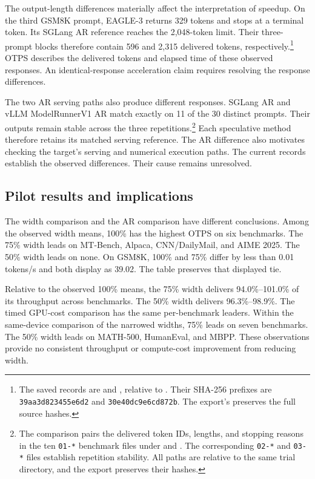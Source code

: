\documentclass[conference,onecolumn]{IEEEtran}
\begin{document}
The output-length differences materially affect the interpretation of speedup. On the third GSM8K prompt, EAGLE-3 returns 329 tokens and stops at a terminal token. Its SGLang AR reference reaches the 2,048-token limit. Their three-prompt blocks therefore contain 596 and 2,315 delivered tokens, respectively.\footnote{The saved records are  and , relative to . Their SHA-256 prefixes are \texttt{39aa3d823455e6d2} and \texttt{30e40dc9e6cd872b}. The export's  preserves the full source hashes.} OTPS describes the delivered tokens and elapsed time of these observed responses. An identical-response acceleration claim requires resolving the response differences.

The two AR serving paths also produce different responses. SGLang AR and vLLM ModelRunnerV1 AR match exactly on 11 of the 30 distinct prompts. Their outputs remain stable across the three repetitions.\footnote{The comparison pairs the delivered token IDs, lengths, and stopping reasons in the ten \texttt{01-*} benchmark files under  and . The corresponding \texttt{02-*} and \texttt{03-*} files establish repetition stability. All paths are relative to the same trial directory, and the export preserves their hashes.} Each speculative method therefore retains its matched serving reference. The AR difference also motivates checking the target's serving and numerical execution paths. The current records establish the observed differences. Their cause remains unresolved.

\subsection{Pilot results and implications}
The width comparison and the AR comparison have different conclusions. Among the observed width means, 100\% has the highest OTPS on six benchmarks. The 75\% width leads on MT-Bench, Alpaca, CNN/DailyMail, and AIME 2025. The 50\% width leads on none. On GSM8K, 100\% and 75\% differ by less than 0.01 tokens/s and both display as 39.02. The table preserves that displayed tie.

Relative to the observed 100\% means, the 75\% width delivers 94.0\%--101.0\% of its throughput across benchmarks. The 50\% width delivers 96.3\%--98.9\%. The timed GPU-cost comparison has the same per-benchmark leaders. Within the same-device comparison of the narrowed widths, 75\% leads on seven benchmarks. The 50\% width leads on MATH-500, HumanEval, and MBPP. These observations provide no consistent throughput or compute-cost improvement from reducing width.
\end{document}

